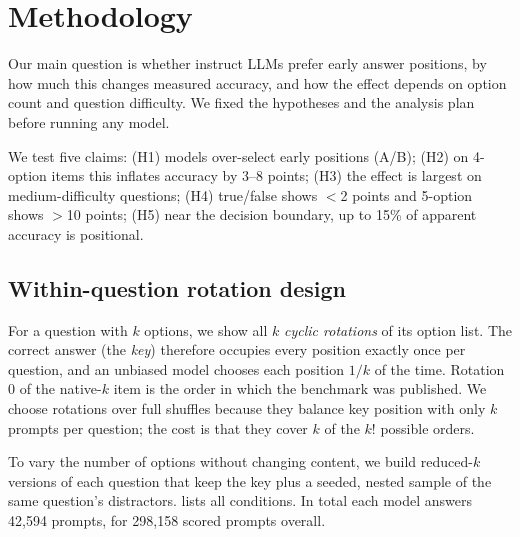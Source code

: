 \section{Methodology}
\label{sec:method}

Our main question is whether instruct LLMs prefer early answer positions, by how much this changes measured accuracy, and how the effect depends on option count and question difficulty.
We fixed the hypotheses and the analysis plan before running any model.

We test five claims:
(H1) models over-select early positions (A/B);
(H2) on 4-option items this inflates accuracy by 3--8 points;
(H3) the effect is largest on medium-difficulty questions;
(H4) true/false shows $<$2 points and 5-option shows $>$10 points;
(H5) near the decision boundary, up to 15\% of apparent accuracy is positional.

\subsection{Within-question rotation design}
\label{sec:design}

For a question with $k$ options, we show all $k$ \emph{cyclic rotations} of its option list.
The correct answer (the \emph{key}) therefore occupies every position exactly once per question, and an unbiased model chooses each position $1/k$ of the time.
Rotation 0 of the native-$k$ item is the order in which the benchmark was published.
We choose rotations over full shuffles because they balance key position with only $k$ prompts per question; the cost is that they cover $k$ of the $k!$ possible orders.

To vary the number of options without changing content, we build reduced-$k$ versions of each question that keep the key plus a seeded, nested sample of the same question's distractors.
 lists all conditions.
In total each model answers 42{,}594 prompts, for 298{,}158 scored prompts overall.

